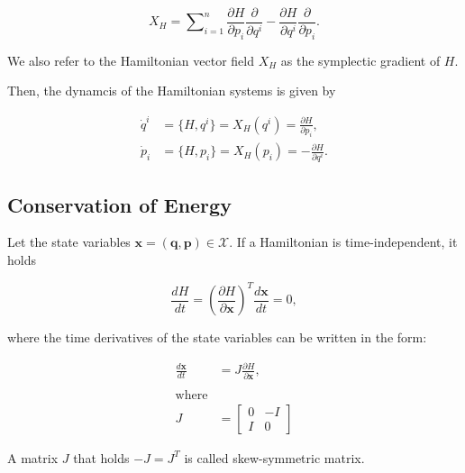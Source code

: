 \documentclass[
	parskip, 			   %
	twoside, 			   %
	DIV=14, 			   %
	BCOR=15.0mm, 		   %
	headsepline, 		   %
	open=right, 		   %
	captions=tableheading, %
	bibliography=totoc,    %
	numbers=noenddot       %
]{scrreprt}
\begin{document}
\begin{equation}
    \label{eq:Hamiltonian_vector_field}
    X_H = \sum\nolimits_{i=1}^n \frac{\partial H}{\partial p_i} \frac{\partial}{\partial q^i} - \frac{\partial H}{\partial q^i} \frac{\partial}{\partial p_i}.
\end{equation}

We also refer to the Hamiltonian vector field $X_H$ as the symplectic gradient of $H$.

Then, the dynamcis of the Hamiltonian systems is given by 

\begin{equation}
    \label{eq:Hamiltonian_dynamcis}
    \begin{aligned}
    \dot{q}^i &= \{H, q^i\} = X_H(q^i)=\frac{\partial H}{\partial p_i},\\
    \dot{p}_i &= \{H, p_i\}= X_H(p_i)=-\frac{\partial H}{\partial q^i}.
    \end{aligned}
\end{equation}


\subsection{Conservation of Energy}
Let the state variables $\mathbf{x}=(\mathbf{q},\mathbf{p}) \in \mathcal{X}$. If a Hamiltonian is time-independent, it holds

\begin{equation}
    \label{eq:Hamiltonian_invariant}
    \frac{dH}{dt} = (\frac{\partial H}{\partial \mathbf{x}})^T \frac{d\mathbf{x}}{dt} = 0,
\end{equation}

where the time derivatives of the state variables can be written in the form:

\begin{equation}
    \label{eq:Hamiltonian_symplectic}
    \begin{aligned}
        \frac{d\mathbf{x}}{dt} &= J \frac{\partial H}{\partial \mathbf{x}},\\\\
        \text{where}\\
        J &= \left[ \begin{array}{cc}
            0 & -I \\
            I & 0
        \end{array} \right]
    \end{aligned}
\end{equation}

A matrix $J$ that holds $-J = J^T$ is called skew-symmetric matrix.
\end{document}
